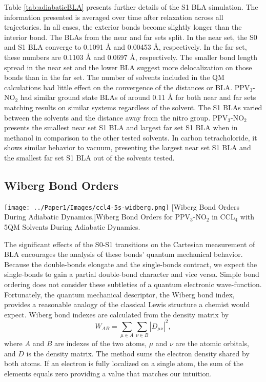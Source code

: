     Table \ref{tab:adiabaticBLA} presents further details of the S1 BLA simulation.
    The information presented is averaged over time after relaxation across all trajectories.
    In all cases, the exterior bonds become slightly longer than the interior bond.
    The BLAs from the near and far sets split.
    In the near set, the S0 and S1 BLA converge to 0.1091 Å and 0.00453 Å, respectively.
    In the far set, these numbers are 0.1103 Å and 0.0697 Å, respectively.
    The smaller bond length spread in the near set and the lower BLA suggest more delocalization on those bonds than in the far set. 
    The number of solvents included in the QM calculations had little effect on the convergence of the distances or BLA.
    PPV\(_3\)-NO\(_2\) had similar ground state BLAs of around 0.11 Å for both near and far sets matching results on similar systems regardless of the solvent. \cite{nelson2011nonadiabatic}
    The S1 BLAs varied between the solvents and the distance away from the nitro group.
    PPV\(_3\)-NO\(_2\) presents the smallest near set S1 BLA and largest far set S1 BLA when in methanol in comparison to the other tested solvents.
In carbon tetracholoride, it shows similar behavior to vacuum, presenting the largest near set S1 BLA and the smallest far set S1 BLA out of the solvents tested.

\subsection{Wiberg Bond Orders}
\begin{minipage}[c]{\textwidth}
  \centering
  \texttt{[image: ../Paper1/Images/ccl4-5s-widberg.png]}
  [Wiberg Bond Orders During Adiabatic Dynamics.]{Wiberg Bond Orders for PPV\(_3\)-NO\(_2\) in CCL\(_4\) with 5QM Solvents During Adiabatic Dynamics. }
  \label{fig:bondOrdersAdiabatic}
\end{minipage}\bigskip

The significant effects of the S0-S1 transitions on the Cartesian measurement of BLA encourages the analysis of these bonds' quantum mechanical behavior.
Because the double-bonds elongate and the single-bonds contract, we expect the single-bonds to gain a partial double-bond character and vice versa.
Simple bond ordering does not consider these subtleties of a quantum electronic wave-function.
Fortunately, the quantum mechanical descriptor, the Wiberg bond index, provides a reasonable analogy of the classical Lewis structure a chemist would expect.
Wiberg bond indexes are calculated from the density matrix by 
\begin{equation}
  W_{AB} = \sum_{\mu\in A}\sum_{\nu \in B} | D_{\mu\nu} |^2,
\end{equation}
where \(A\) and \(B\) are indexes of the two atoms, \(\mu\) and \(\nu\) are the atomic orbitals, and \(D\) is the density matrix.
The method sums the electron density shared by both atoms.
If an electron is fully localized on a single atom, the sum of the elements equals zero providing a value that matches our intuition. 


